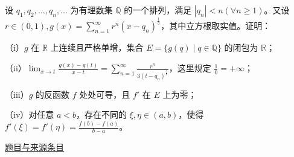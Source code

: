 \documentclass[UTF8,12pt,a4paper,fontset=fandol]{ctexart}
\begin{document}
\begin{example}[来源序号7]\label{ex:fin14-high:7}\label{pr:fin14-high:7}

设 $q_1, q_2, \dots, q_n, \dots$ 为有理数集 $\mathbb{Q}$ 的一个排列，满足 $|q_n| < n (\forall n \geq 1)$。又设 $r \in (0, 1), g(x) = \sum_{n=1}^{\infty} r^n (x - q_n)^{\frac{1}{3}}$，其中立方根取实值。证明：

（i）$g$ 在 $\mathbb{R}$ 上连续且严格单增，集合 $E = \{g(q) \mid q \in \mathbb{Q}\}$ 的闭包为 $\mathbb{R}$；

（ii）$\lim_{x \to t} \frac{g(x) - g(t)}{x - t} = \sum_{n=1}^{\infty} \frac{r^n}{3 (t - q_n)^{\frac{2}{3}}}$，这里规定 $\frac{1}{0} = +\infty$；

（iii）$g$ 的反函数 $f$ 处处可导，且 $f'$ 在 $E$ 上为零；

（iv）对任意 $a < b$，存在不同的 $\xi, \eta \in (a, b)$，使得 $f'(\xi) = f'(\eta) = \frac{f(b) - f(a)}{b - a}$。

\par\href{https://github.com/lzxcr/cmc-mathematics/blob/64916fa1fdbc3e444a652eca204d5669058ee321/src/problems/finals/14/07.md}{题目与来源条目}

\end{example}
\end{document}
